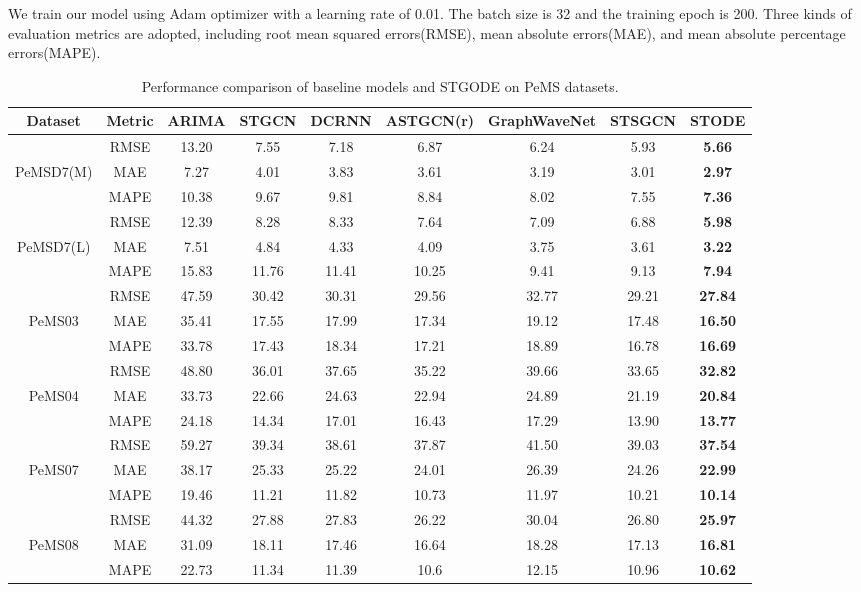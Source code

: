 \documentclass[sigconf]{acmart}
\theoremstyle{definition}
\begin{document}
We train our model using Adam optimizer with a learning rate of 0.01. The batch size is 32 and the training epoch is 200. Three kinds of evaluation metrics are adopted, including root mean squared errors(RMSE), mean absolute errors(MAE), and mean absolute percentage errors(MAPE).

\begin{table*}[htbp]
  \centering
    \begin{tabular}{ccccccccc}
    \toprule
    Dataset & Metric & ARIMA & STGCN & DCRNN & ASTGCN(r) & GraphWaveNet & STSGCN & \textbf{STODE} \\
    \midrule
          & RMSE  & 13.20 & 7.55  & 7.18  & 6.87  & 6.24  & 5.93  & \textbf{5.66} \\
    PeMSD7(M) & MAE   & 7.27  & 4.01  & 3.83  & 3.61  & 3.19  & 3.01  & \textbf{2.97} \\
          & MAPE  & 10.38 & 9.67  & 9.81  & 8.84  & 8.02  & 7.55  & \textbf{7.36} \\
    \midrule
          & RMSE  & 12.39 & 8.28  & 8.33  & 7.64  & 7.09  & 6.88  & \textbf{5.98} \\
    PeMSD7(L) & MAE   & 7.51  & 4.84  & 4.33  & 4.09  & 3.75  & 3.61  & \textbf{3.22} \\
          & MAPE  & 15.83 & 11.76 & 11.41 & 10.25 & 9.41  & 9.13  & \textbf{7.94} \\
    \midrule
          & RMSE  & 47.59 & 30.42 & 30.31 & 29.56 & 32.77 & 29.21 & \textbf{27.84} \\
    PeMS03 & MAE   & 35.41 & 17.55 & 17.99 & 17.34 & 19.12 & 17.48 & \textbf{16.50} \\
          & MAPE  & 33.78 & 17.43 & 18.34 & 17.21 & 18.89 & 16.78 & \textbf{16.69} \\
    \midrule
          & RMSE  & 48.80 & 36.01 & 37.65 & 35.22 & 39.66 & 33.65 & \textbf{32.82} \\
    PeMS04 & MAE   & 33.73 & 22.66 & 24.63 & 22.94 & 24.89 & 21.19 & \textbf{20.84} \\
          & MAPE  & 24.18 & 14.34 & 17.01 & 16.43 & 17.29 & 13.90 & \textbf{13.77} \\
    \midrule
          & RMSE  & 59.27 & 39.34 & 38.61 & 37.87 & 41.50 & 39.03 & \textbf{37.54} \\
    PeMS07 & MAE   & 38.17 & 25.33 & 25.22 & 24.01 & 26.39 & 24.26 & \textbf{22.99} \\
          & MAPE  & 19.46 & 11.21 & 11.82 & 10.73 & 11.97 & 10.21 & \textbf{10.14} \\
    \midrule
          & RMSE  & 44.32 & 27.88 & 27.83 & 26.22 & 30.04 & 26.80 & \textbf{25.97} \\
    PeMS08 & MAE   & 31.09 & 18.11 & 17.46 & 16.64 & 18.28 & 17.13 & \textbf{16.81} \\
          & MAPE  & 22.73 & 11.34 & 11.39 & 10.6  & 12.15 & 10.96 &  \textbf{10.62} \\
    \bottomrule
    \end{tabular}\caption{Performance comparison of baseline models and STGODE on PeMS datasets.}
\label{tab:result}
\end{table*}
\end{document}

